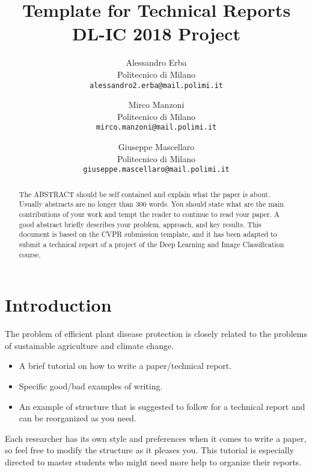 \documentclass[10pt,twocolumn,letterpaper]{article}
\begin{document}
\title{Template for Technical Reports \\ DL-IC 2018 Project}

\author{
Alessandro Erba\\
Politecnico di Milano\\
{\tt\small alessandro2.erba@mail.polimi.it}
\and
Mirco Manzoni\\
Politecnico di Milano\\
{\tt\small mirco.manzoni@mail.polimi.it}
\and
Giuseppe Mascellaro\\
Politecnico di Milano\\
{\tt\small giuseppe.mascellaro@mail.polimi.it}
}

\maketitle

\begin{abstract}
   The ABSTRACT should be self contained and explain what the paper is about. Usually abstracts are no longer than 300 words. You should state what are the main contributions of your work and tempt the reader to continue to read your paper. A good abstract briefly describes your problem, approach, and key results. This document is based on the CVPR submission template, and it has been adapted to submit a technical report of a project of the Deep Learning and Image Classification course.
\end{abstract}

\section{Introduction}
The problem of efficient plant disease protection is closely related to the problems
of sustainable agriculture and climate change. \cite{Authors1}
\begin{itemize}
    \item A brief tutorial on how to write a paper/technical report.
    \item Specific good/bad examples of writing.
    \item An example of structure that is suggested to follow for a technical report and can be reorganized as you need.
\end{itemize}
Each researcher has its own style and preferences when it comes to write a paper, so feel free to modify the structure as it pleases you.
This tutorial is especially directed to master students who might need more help to organize their reports.
\end{document}
